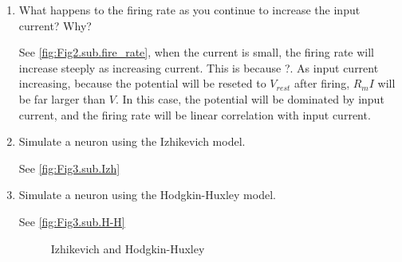 \documentclass[11pt]{article}
\begin{document}
\begin{enumerate}
		\item What happens to the firing rate as you continue to increase the input current? Why?
		
		See \ref{fig:Fig2.sub.fire_rate}, when the current is small, the firing rate will increase steeply as increasing current. This is because ?. As input current increasing, because the potential will be reseted to $V_{rest}$ after firing, $R_mI$ will be far larger than $V$. In this case, the potential will be dominated by input current, and the firing rate will be linear correlation with input current.
		
		\item Simulate a neuron using the Izhikevich model.
		
		See \ref{fig:Fig3.sub.Izh}
		\item Simulate a neuron using the Hodgkin-Huxley model.
		
		See \ref{fig:Fig3.sub.H-H}
		\begin{figure}[ht]
			\centering
			\caption{Izhikevich and Hodgkin-Huxley}
		\end{figure}
		

\end{enumerate}
\end{document}
